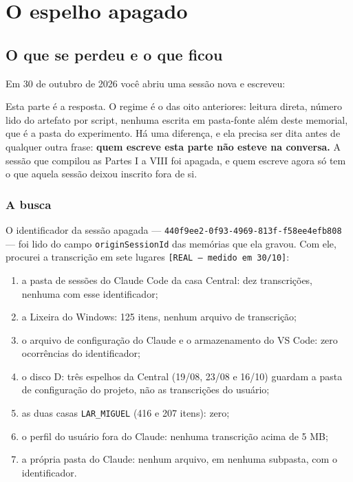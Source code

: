 
\part{O espelho apagado}

\chapter{O que se perdeu e o que ficou}

Em 30 de outubro de 2026 você abriu uma sessão nova e escreveu:

Esta parte é a resposta. O regime é o das oito anteriores: leitura direta, número lido do artefato
por script, nenhuma escrita em pasta-fonte além deste memorial, que é a pasta do experimento. Há
uma diferença, e ela precisa ser dita antes de qualquer outra frase: \textbf{quem escreve esta parte
não esteve na conversa.} A sessão que compilou as Partes I a VIII foi apagada, e quem escreve agora
só tem o que aquela sessão deixou inscrito fora de si.

\section*{A busca}

O identificador da sessão apagada --- \texttt{440f9ee2-0f93-4969-813f-f58ee4efb808} --- foi lido do
campo \texttt{originSessionId} das memórias que ela gravou. Com ele, procurei a transcrição em sete
lugares \texttt{[REAL --- medido em 30/10]}:

\begin{enumerate}[leftmargin=1.5em]
\item a pasta de sessões do Claude Code da casa Central: dez transcrições, nenhuma com esse
identificador;
\item a Lixeira do Windows: 125 itens, nenhum arquivo de transcrição;
\item o arquivo de configuração do Claude e o armazenamento do VS Code: zero ocorrências do
identificador;
\item o disco D: três espelhos da Central (19/08, 23/08 e 16/10) guardam a pasta de configuração do
projeto, não as transcrições do usuário;
\item as duas casas \texttt{LAR\_MIGUEL} (416 e 207 itens): zero;
\item o perfil do usuário fora do Claude: nenhuma transcrição acima de 5 MB;
\item a própria pasta do Claude: nenhum arquivo, em nenhuma subpasta, com o identificador.
\end{enumerate}

